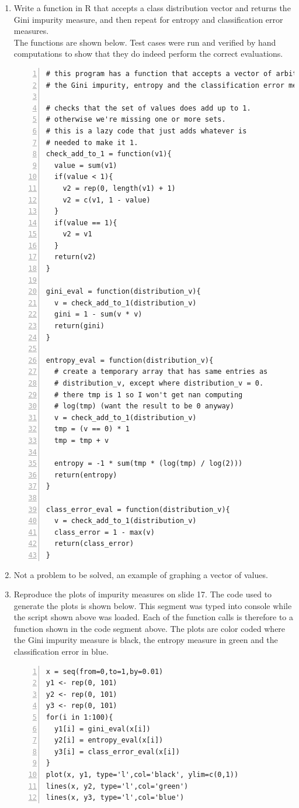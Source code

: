 \documentclass[11pt]{article}
\begin{document}
\begin{enumerate}
\begin{enumerate}
          \end{enumerate}
    \item Write a function in R that accepts a class distribution vector and returns the Gini impurity measure, and then 
          repeat for entropy and classification error measures. \\
          The functions are shown below. Test cases were run and verified by hand computations to show that they do indeed 
          perform the correct evaluations. 
\begin{Verbatim}[numbers=left]
# this program has a function that accepts a vector of arbitrary length and computes
# the Gini impurity, entropy and the classification error measures. 

# checks that the set of values does add up to 1.
# otherwise we're missing one or more sets.  
# this is a lazy code that just adds whatever is 
# needed to make it 1. 
check_add_to_1 = function(v1){
  value = sum(v1)
  if(value < 1){
  	v2 = rep(0, length(v1) + 1)
    v2 = c(v1, 1 - value)
  }
  if(value == 1){
  	v2 = v1
  }
  return(v2)
}

gini_eval = function(distribution_v){
  v = check_add_to_1(distribution_v)
  gini = 1 - sum(v * v)
  return(gini)
}

entropy_eval = function(distribution_v){
  # create a temporary array that has same entries as
  # distribution_v, except where distribution_v = 0. 
  # there tmp is 1 so I won't get nan computing 
  # log(tmp) (want the result to be 0 anyway)
  v = check_add_to_1(distribution_v)
  tmp = (v == 0) * 1
  tmp = tmp + v

  entropy = -1 * sum(tmp * (log(tmp) / log(2)))
  return(entropy)
}

class_error_eval = function(distribution_v){
  v = check_add_to_1(distribution_v)
  class_error = 1 - max(v)
  return(class_error)
}
\end{Verbatim}

    \item Not a problem to be solved, an example of graphing a vector of values. 
    \item Reproduce the plots of impurity measures on slide 17. 
      The code used to generate the plots is shown below. This segment was typed 
      into console while the script shown above was loaded. Each of the function 
      calls is therefore to a function shown in the code segment above. 
      The plots are color 
      coded where the Gini impurity measure is black, the entropy measure in green
      and the classification error in blue.
\begin{Verbatim}[numbers=left]
x = seq(from=0,to=1,by=0.01)
y1 <- rep(0, 101)
y2 <- rep(0, 101)
y3 <- rep(0, 101)
for(i in 1:100){
  y1[i] = gini_eval(x[i])
  y2[i] = entropy_eval(x[i])
  y3[i] = class_error_eval(x[i])
}
plot(x, y1, type='l',col='black', ylim=c(0,1))
lines(x, y2, type='l',col='green')
lines(x, y3, type='l',col='blue')
\end{Verbatim}


\end{enumerate}
\end{document}
